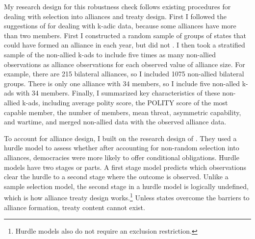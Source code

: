 \documentclass[12pt]{article}
\begin{document}
My research design for this robustness check follows existing procedures for dealing with selection into alliances and treaty design. 
First I followed the suggestions of \citet{Poast2010} for dealing with k-adic data, because some alliances have more than two members. 
First I constructed a random sample of groups of states that could have formed an alliance in each year, but did not \citep{FordhamPoast2014}.
I then took a stratified sample of the non-allied k-ads to include five times as many non-allied observations as alliance observations for each observed value of alliance size. 
For example, there are 215 bilateral alliances, so I included 1075 non-allied bilateral groups. 
There is only one alliance with 34 members, so I include five non-alled k-ads with 34 members. 
Finally, I summarized key characteristics of these non-allied k-ads, including average polity score, the POLITY score of the most capable member, the number of members, mean threat, asymmetric capability, and wartime, and merged non-allied data with the observed alliance data. 


To account for alliance design, I built on the research design of \citet{Chibaetal2015}. 
They used a hurdle model to assess whether after accounting for non-random selection into alliances, democracies were more likely to offer conditional obligations.
Hurdle models have two stages or parts.
A first stage model predicts which observations clear the hurdle to a second stage where the outcome is observed. 
Unlike a sample selection model, the second stage in a hurdle model is logically undefined, which is how alliance treaty design works.\footnote{Hurdle models also do not require an exclusion restriction.} 
Unless states overcome the barriers to alliance formation, treaty content cannot exist. 
\end{document}
